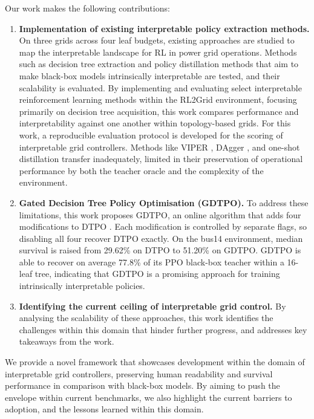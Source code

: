Our work makes the following contributions:

\begin{enumerate}
  \item \textbf{Implementation of existing interpretable policy extraction methods.} On three grids across four leaf budgets, existing approaches are studied to map the interpretable landscape for RL in power grid operations. Methods such as decision tree extraction and policy distillation methods that aim to make black-box models intrinsically interpretable are tested, and their scalability is evaluated. By implementing and evaluating select interpretable reinforcement learning methods within the RL2Grid environment, focusing primarily on decision tree acquisition, this work compares performance and interpretability against one another within topology-based grids. For this work, a reproducible evaluation protocol is developed for the scoring of interpretable grid controllers. Methods like VIPER \cite{bastani2018verifiable}, DAgger \cite{ross2011reduction}, and one-shot distillation transfer inadequately, limited in their preservation of operational performance by both the teacher oracle and the complexity of the environment.
  \item \textbf{Gated Decision Tree Policy Optimisation (GDTPO).} To address these limitations, this work proposes GDTPO, an online algorithm that adds four modifications to DTPO \cite{vos2024optimizing}. Each modification is controlled by separate flags, so disabling all four recover DTPO exactly. On the bus14 environment, median survival is raised from 29.62\% on DTPO to 51.20\% on GDTPO. GDTPO is able to recover on average 77.8\% of its PPO black-box teacher within a 16-leaf tree, indicating that GDTPO is a promising approach for training intrinsically interpretable policies. 
  \item \textbf{Identifying the current ceiling of interpretable grid control.} By analysing the scalability of these approaches, this work identifies the challenges within this domain that hinder further progress, and addresses key takeaways from the work.
\end{enumerate}

We provide a novel framework that showcases development within the domain of interpretable grid controllers, preserving human readability and survival performance in comparison with black-box models. By aiming to push the envelope within current benchmarks, we also highlight the current barriers to adoption, and the lessons learned within this domain.

